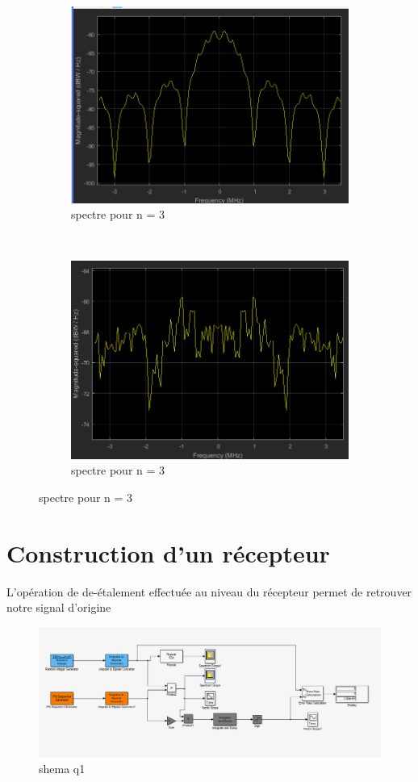 \documentclass{report}
\begin{document}
\begin{figure}
	\centering
	\begin{subfigure}[b]{0.4\textwidth}
	\includegraphics[width=0.78\linewidth]{spectren33}
\caption{spectre pour n = 3}
\label{fig:spectren33}
	\end{subfigure}
	~ %
	\begin{subfigure}[b]{0.4\textwidth}
	\includegraphics[width=0.78\linewidth]{spectren3}
\caption{spectre pour n = 3}
\label{fig:spectren3}
	\end{subfigure}
\end{figure}


\newpage
\section{Construction d'un récepteur}%
L'opération de de-étalement effectuée au niveau du récepteur permet de retrouver notre signal
d'origine
\begin{figure}[h]
	\centering
	\includegraphics[width=0.7\linewidth]{schema_q1}
	\caption{shema q1}
	\label{fig:schemaq1}
\end{figure}
\end{document}

